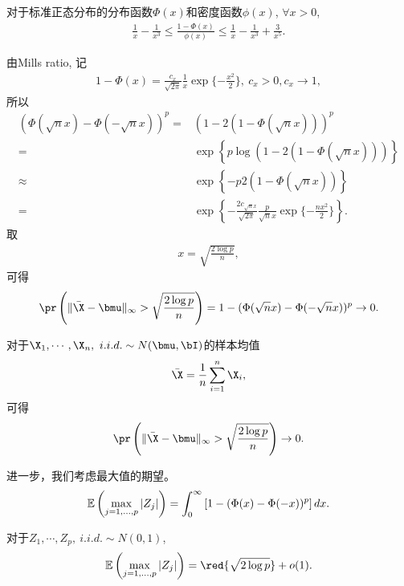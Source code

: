 \begin{lem}
	对于标准正态分布的分布函数$\Phi(x)$和密度函数$\phi(x)$, $\forall x >0$,
	\begin{align*}
		\frac{1}{x}-\frac{1}{x^3} \leq \frac{1-\Phi(x)}{\phi(x)} \leq \frac{1}{x}-\frac{1}{x^3}+\frac{3}{x^5}.
	\end{align*}		
\end{lem}
由Mills ratio, 记
\begin{align*}
	1-\Phi(x)=\frac{c_x}{\sqrt{2\pi}} \frac{1}{x}\exp\{-\frac{x^2}{2}\},~c_x>0, c_x \to 1,
	\end{align*}
所以
\begin{align*}
	(\Phi(\sqrt{n} x)-\Phi(-\sqrt{n} x))^p=&\left(1-2(1-\Phi(\sqrt{n}x))   \right)^p\\
	=&\exp\left\{p \log\left(1-2(1-\Phi(\sqrt{n}x))   \right) \right\}\\
	\approx &\exp\left\{-p 2\left(1-\Phi(\sqrt{n}x)   \right) \right\}\\
	=& \exp\left\{-\frac{2 c_{\sqrt{n}x}}{\sqrt{2\pi}} \frac{p}{\sqrt{n}x}\exp\{-\frac{nx^2}{2}\} \right\}.
	\end{align*}	
取
\begin{align*}
	x=\sqrt{\frac{2\log p}{n}},
\end{align*}
可得
\begin{align*}
	\pr\left(\|\bar{\X}-\bmu\|_\infty>\sqrt{\frac{2\log p}{n}}\right)=1-(\Phi(\sqrt{n} x)-\Phi(-\sqrt{n} x))^p \to 0.
\end{align*}
\begin{prop}
对于$\X_1,\cdots, \X_n,~i.i.d.\sim N(\bmu, \bI)$的样本均值
	\begin{align*}
		\bar{\X}=\frac{1}{n} \sum_{i=1}^n \X_i,
	\end{align*}	
可得	
\begin{align*}
	\pr\left(\|\bar{\X}-\bmu\|_\infty>\sqrt{\frac{2\log p}{n}}\right) \to 0.
\end{align*}
\end{prop}

进一步，我们考虑最大值的期望。
\begin{align*}
\mathbb{E} \left( \max_{j=1,\ldots,p} |Z_j| \right)=\int_0^\infty \left[ 1-(\Phi(x)-\Phi(-x))^p\right]dx.
\end{align*}
\begin{prop}
	对于$Z_1,\cdots, Z_p,~i.i.d.\sim N(0,1)$,
	\begin{align*}
		\E \left( \max_{j=1,\ldots,p} |Z_j| \right)=\red{\sqrt{2 \log p}}+o(1).
	\end{align*}
	\end{prop}

